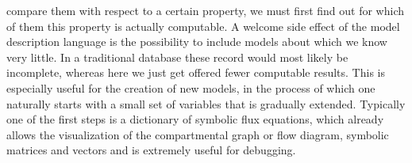 compare them with respect to a certain property, we must first find out for
which of them this property is actually computable.  A welcome side effect
of the  model description language is the possibility to include
models about which we know very little. In a traditional database these
record would most likely be incomplete, whereas here we just get offered
fewer computable results.  
This is especially useful for the creation of new
models, in the process of which one naturally starts with a small set of
variables that is gradually extended.
Typically one of the first steps is a dictionary of symbolic flux equations, which already allows the visualization
of the compartmental graph or flow diagram, symbolic matrices and vectors and is extremely useful for debugging.



